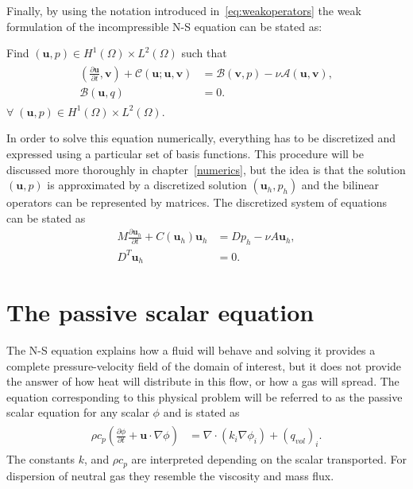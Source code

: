 Finally, by using the notation introduced in~\ref{eq:weakoperators} the weak formulation of the incompressible
N-S equation can be stated as: 

Find $(\mathbf{u}, p) \in H^1(\Omega)\times L^2(\Omega)$ such that 
\begin{align}
    \begin{split}
        (\frac{\partial \mathbf{u}}{\partial t},\mathbf{v})
        + \mathcal{C}(\mathbf{u};\mathbf{u},\mathbf{v})
        &= \mathcal{B}(\mathbf{v},p) 
        -\nu\mathcal{A}(\mathbf{u},\mathbf{v}), \\
        \mathcal{B}(\mathbf{u},q) &= 0.
    \end{split}
	\label{eq:NSweak}
\end{align}
$\forall\; (\mathbf{u}, p) \in H^1(\Omega)\times L^2(\Omega)$.
%

In order to solve this equation numerically, everything has to be discretized and expressed 
using a particular set of basis functions. This procedure will be discussed more thoroughly
in chapter~\ref{numerics}, but the idea is that the solution $(\mathbf{u},p)$ is approximated 
by a discretized solution $(\mathbf{u}_h,p_h)$ and the bilinear operators can be represented 
by matrices. The discretized system of equations can be stated as
%
\begin{align}
    M\frac{\partial \mathbf{u}_h}{\partial t} +C(\mathbf{u}_h)\mathbf{u}_h &= Dp_h-\nu A\mathbf{u}_h,\\
    D^T\mathbf{u}_h &= 0.
    \label{eq:NSMatrixform}
\end{align}
%
\section{The passive scalar equation}
The N-S equation explains how a fluid will behave and solving it provides a complete pressure-velocity field of the 
domain of interest, but it does not provide the answer of how heat will distribute in this flow, or how a gas will spread.
The equation corresponding to this physical problem will be referred to as the passive scalar equation for any scalar 
$\phi$ and is stated as 
\begin{align}
    \begin{split}
        \rho c_p(\frac{\partial \phi}{\partial t} + \mathbf{u}\cdot \nabla\phi) 
        &= \nabla \cdot(k_i\nabla \phi_i)+ (q_{vol})_i.
    \end{split}
	\label{eq:PS}
\end{align}
The constants  $k$, and $\rho c_p$ are interpreted depending on 
the scalar transported. For dispersion of neutral gas they 
resemble the viscosity and mass flux. 

